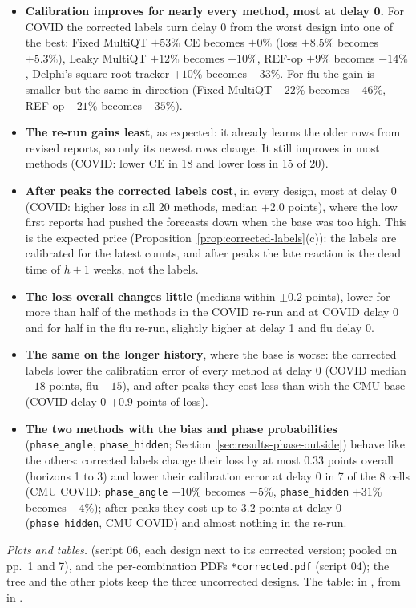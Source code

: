 \documentclass[11pt,a4paper]{article}
\theoremstyle{definition}
\theoremstyle{remark}
\begin{document}
\begin{itemize}[leftmargin=*,itemsep=2pt]
\item \textbf{Calibration improves for nearly every method, most at delay 0.}
For COVID the corrected labels turn delay 0 from the worst design into one
of the best: Fixed MultiQT $+53\%$ CE becomes $+0\%$ (loss $+8.5\%$ becomes
$+5.3\%$), Leaky MultiQT $+12\%$ becomes $-10\%$, REF-op $+9\%$ becomes $-14\%$,
Delphi's square-root tracker $+10\%$ becomes $-33\%$. For flu the gain is smaller
but the same in direction (Fixed MultiQT $-22\%$ becomes $-46\%$, REF-op $-21\%$
becomes $-35\%$).
\item \textbf{The re-run gains least}, as expected: it already learns the
older rows from revised reports, so only its newest rows change. It still
improves in most methods (COVID: lower CE in 18 and lower loss in 15 of 20).
\item \textbf{After peaks the corrected labels cost}, in every design, most at
delay 0 (COVID: higher loss in all 20 methods, median $+2.0$ points), where
the low first reports had pushed the forecasts down when the base was too
high. This is the expected price
(Proposition~\ref{prop:corrected-labels}(c)): the labels are calibrated for
the latest counts, and after peaks the late reaction is the dead time of $h+1$
weeks, not the labels.
\item \textbf{The loss overall changes little} (medians within $\pm0.2$
points), lower for more than half of the methods in the COVID re-run and at
COVID delay 0 and for half in the flu re-run, slightly higher at delay 1 and
flu delay 0.
\item \textbf{The same on the longer history}, where the base is worse: the
corrected labels lower the calibration error of every method at delay 0
(COVID median $-18$ points, flu $-15$), and after peaks they cost less than
with the CMU base (COVID delay 0 $+0.9$ points of loss).
\item \textbf{The two methods with the bias and phase probabilities}
(\texttt{phase\_angle}, \texttt{phase\_hidden};
Section~\ref{sec:results-phase-outside}) behave like the others: corrected
labels change their loss by at most $0.33$ points overall (horizons 1 to 3)
and lower their calibration error at delay 0 in 7 of the 8 cells (CMU COVID:
\texttt{phase\_angle} $+10\%$ becomes $-5\%$, \texttt{phase\_hidden} $+31\%$
becomes $-4\%$); after peaks they cost up to $3.2$ points at delay 0
(\texttt{phase\_hidden}, CMU COVID) and almost nothing in the re-run.
\end{itemize}
\emph{Plots and tables.} 
(script 06, each design next to its corrected version; pooled on pp.~1 and
7),  and the
per-combination PDFs \texttt{*corrected.pdf} (script 04); the tree and the
other plots keep the three uncorrected designs. The table:
 in , from
 in .
\end{document}
